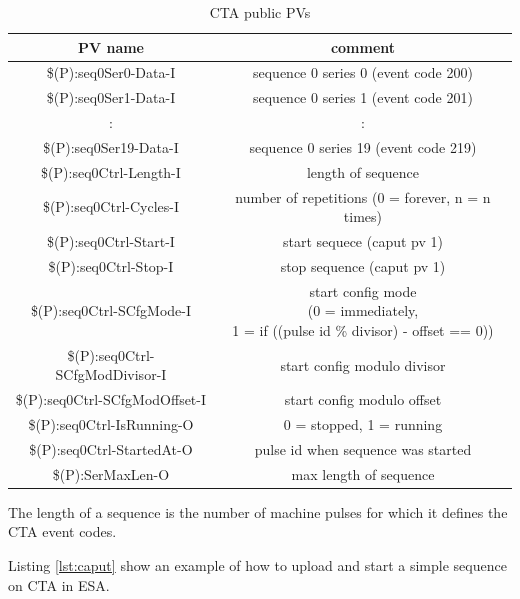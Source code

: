 \documentclass[12pt,a4paper]{article}
\begin{document}
\begin{table}[!hbt]
\caption{CTA public PVs}
\label{tab:cta_public_pvs}
\centering
  \begin{tabular}{|c|c|}
    \hline \textbf{PV name} & \textbf{comment} \\ \hline
    \hline \$(P):seq0Ser0-Data-I & sequence 0 series 0 (event code 200)\\
    \hline \$(P):seq0Ser1-Data-I & sequence 0 series 1 (event code 201)\\
    \hline : & :\\
    \hline \$(P):seq0Ser19-Data-I & sequence 0 series 19 (event code 219)\\
    \hline \$(P):seq0Ctrl-Length-I & length of sequence\\
    \hline \$(P):seq0Ctrl-Cycles-I & number of repetitions (0 = forever, n = n times)\\
    \hline \$(P):seq0Ctrl-Start-I & start sequece (caput pv 1)\\
    \hline \$(P):seq0Ctrl-Stop-I& stop sequence (caput pv 1)\\
    \hline \$(P):seq0Ctrl-SCfgMode-I &
           \makecell {start config mode\\
                      (0 = immediately,\\
                      1 = if ((pulse id \% divisor) - offset == 0))}\\
    \hline \$(P):seq0Ctrl-SCfgModDivisor-I & start config modulo divisor\\
    \hline \$(P):seq0Ctrl-SCfgModOffset-I & start config modulo offset\\
    \hline \$(P):seq0Ctrl-IsRunning-O & 0 = stopped, 1 = running\\
    \hline \$(P):seq0Ctrl-StartedAt-O & pulse id when sequence was started\\
    \hline \$(P):SerMaxLen-O & max length of sequence\\
    \hline
  \end{tabular}
\end{table}

The length of a sequence is the number of machine pulses for which it defines the
CTA event codes.

Listing \ref{lst:caput} show an example of how to upload and start a simple sequence
on CTA in ESA.  
\end{document}
